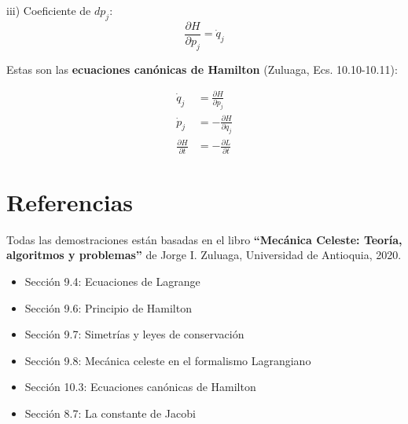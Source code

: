 \documentclass[a4paper]{article}
\begin{document}
iii) Coeficiente de $dp_j$:
\begin{equation}
\frac{\partial H}{\partial p_j} = \dot{q}_j
\end{equation}

Estas son las \textbf{ecuaciones canónicas de Hamilton} (Zuluaga, Ecs. 10.10-10.11):

\begin{equation}
\boxed{
\begin{aligned}
\dot{q}_j &= \frac{\partial H}{\partial p_j} \\
\dot{p}_j &= -\frac{\partial H}{\partial q_j} \\
\frac{\partial H}{\partial t} &= -\frac{\partial L}{\partial t}
\end{aligned}}
\end{equation}

\section*{Referencias}

Todas las demostraciones están basadas en el libro \textbf{``Mecánica Celeste: Teoría, algoritmos y problemas''} de Jorge I. Zuluaga, Universidad de Antioquia, 2020.

\begin{itemize}
    \item Sección 9.4: Ecuaciones de Lagrange
    \item Sección 9.6: Principio de Hamilton
    \item Sección 9.7: Simetrías y leyes de conservación
    \item Sección 9.8: Mecánica celeste en el formalismo Lagrangiano
    \item Sección 10.3: Ecuaciones canónicas de Hamilton
    \item Sección 8.7: La constante de Jacobi
\end{itemize}
\end{document}
